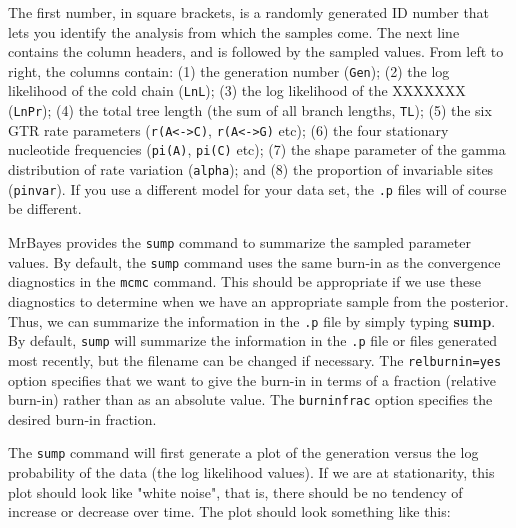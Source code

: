 \documentclass[12pt]{book}
\begin{document}
The first number, in square brackets, is a randomly generated ID number that lets you identify the analysis 
from which the samples come. The next line contains the column headers, and is followed by the sampled 
values. From left to right, the columns contain: (1) the generation number (\texttt{Gen}); (2) the log 
likelihood of the cold chain (\texttt{LnL}); (3) the log likelihood of the XXXXXXX (\texttt{LnPr});
(4) the total tree length (the sum of all branch lengths, 
\texttt{TL}); (5) the six GTR rate parameters (\texttt{r(A<->C)}, \texttt{r(A<->G)} etc); (6) the four 
stationary nucleotide frequencies (\texttt{pi(A)}, \texttt{pi(C)} etc); (7) the shape parameter of the gamma 
distribution of rate variation (\texttt{alpha}); and (8) the proportion of invariable sites 
(\texttt{pinvar}). If you use a different model for your data set, the \texttt{.p} files will of course be 
different.

MrBayes provides the \texttt{sump} command to summarize the sampled parameter values. By default, the 
\texttt{sump} command uses the same burn-in as the convergence diagnostics in the \texttt{mcmc} command. 
This should be appropriate if we use these diagnostics to determine when we have an appropriate sample from 
the posterior. Thus, we can summarize the information in the \texttt{.p} file by simply typing 
\textbf{sump}. By default, \texttt{sump} will summarize the information in the \texttt{.p} file or files 
generated most recently, but the filename can be changed if necessary. The \texttt{relburnin=yes} option 
specifies that we want to give the burn-in in terms of a fraction (relative burn-in) rather than as an 
absolute value. The \texttt{burninfrac} option specifies the desired burn-in fraction.

The \texttt{sump} command will first generate a plot of the generation versus the log probability of the 
data (the log likelihood values). If we are at stationarity, this plot should look like "white noise", that 
is, there should be no tendency of increase or decrease over time. The plot should look something like this:
\end{document}
